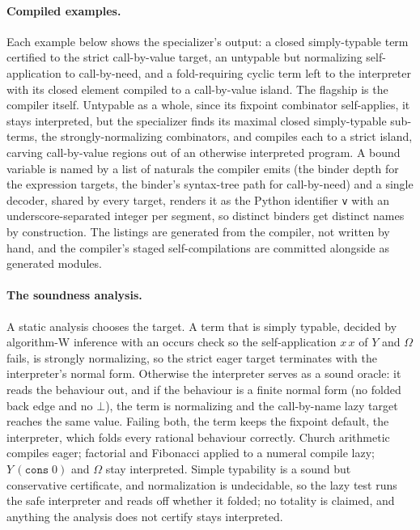\paragraph{Compiled examples.}
Each example below shows the specializer's output: a closed simply-typable term certified to the
strict call-by-value target, an untypable but normalizing self-application to call-by-need, and a
fold-requiring cyclic term left to the interpreter with its closed element compiled to a call-by-value
island. The flagship is the compiler itself. Untypable as a whole, since its fixpoint combinator
self-applies, it stays interpreted, but the specializer finds its maximal closed simply-typable
sub-terms, the strongly-normalizing combinators, and compiles each to a strict island, carving
call-by-value regions out of an otherwise interpreted program. A bound variable is named by a list
of naturals the compiler emits (the binder depth for the expression targets, the binder's
syntax-tree path for call-by-need) and a single decoder, shared by every target, renders it as the
Python identifier \texttt{v} with an underscore-separated integer per segment, so distinct binders
get distinct names by construction. The listings are generated from the compiler, not written by
hand, and the compiler's staged self-compilations are committed alongside as generated modules.


\paragraph{The soundness analysis.}
A static analysis chooses the target. A term that is simply typable, decided by algorithm-W
inference with an occurs check so the self-application $x\,x$ of $Y$ and $\Omega$ fails, is
strongly normalizing, so the strict eager target terminates with the interpreter's normal form.
Otherwise the interpreter serves as a sound oracle: it reads the behaviour out, and if the behaviour
is a finite normal form (no folded back edge and no $\bot$), the term is normalizing and the
call-by-name lazy target reaches the same value. Failing both, the term keeps the fixpoint default,
the interpreter, which folds every rational behaviour correctly. Church arithmetic compiles eager;
factorial and Fibonacci applied to a numeral compile lazy; $Y\,(\mathtt{cons}\;0)$ and $\Omega$ stay
interpreted. Simple typability is a sound but conservative certificate, and normalization is
undecidable, so the lazy test runs the safe interpreter and reads off whether it folded; no totality
is claimed, and anything the analysis does not certify stays interpreted.

